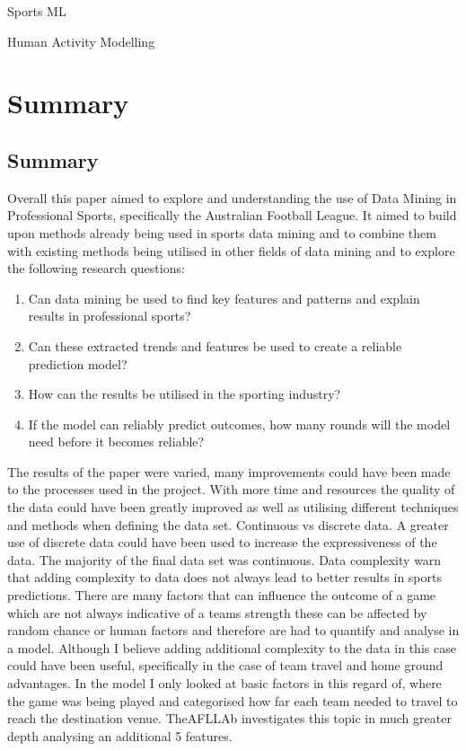 \documentclass{imc-inf}
\begin{document}
	Sports ML \cite{BUNKER201927}
	
	Human Activity Modelling \cite{10.1145/3316782.3322781}
	
	\newpage
	\chapter{Summary}\label{chap:summary}
	\section{Summary}
	Overall this paper aimed to explore and understanding the use of Data Mining in Professional Sports, specifically the Australian Football League. It aimed to build upon methods already being used in sports data mining and to combine them with existing methods being utilised in other fields of data mining and to explore the following research questions:
	\begin{enumerate}
		\item[] Can data mining be used to find key features and patterns and explain results in professional sports?
		
		\item[]Can these extracted trends and features be used to create a reliable prediction model?
		
		\item[] How can the results be utilised in the sporting industry?
		
		\item[] If the model can reliably predict outcomes, how many rounds will the model need before it becomes reliable?
	\end{enumerate}
	
	The results of the paper were varied, many improvements could have been made to the processes used in the project. With more time and resources the quality of the data could have been greatly improved as well as utilising different techniques and methods when defining the data set. 
	Continuous vs discrete data. A greater use of discrete data could have been used to increase the expressiveness of the data. The majority of the final data set was continuous.
	Data complexity \cite{ML_Soccer} warn that adding complexity to data does not always lead to better results in sports predictions. There are many factors that can influence the outcome of a game which are not always indicative of a teams strength these can be affected by random chance or human factors and therefore are had to quantify and analyse in a model. Although I believe adding additional complexity to the data in this case could have been useful, specifically in the case of team travel and home ground advantages. In the model I only looked at basic factors in this regard of, where the game was being played and categorised how far each team needed to travel to reach the destination venue. TheAFLLAb \cite{website:AFL_HG} investigates this topic in much greater depth analysing an additional 5 features. 
	
\end{document}
